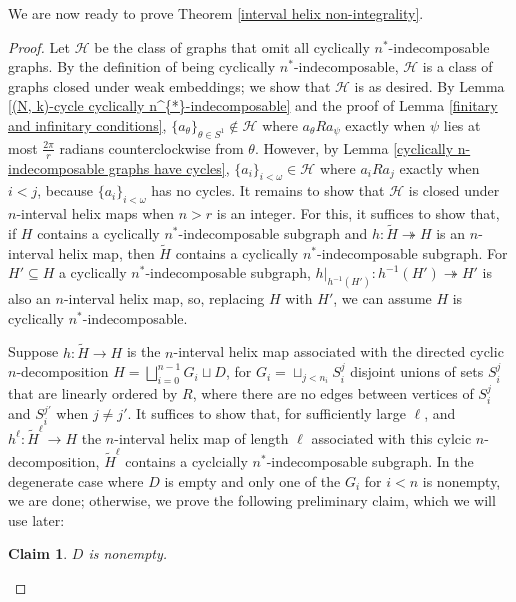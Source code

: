 \documentclass{amsart}
\newtheorem{claim}[theorem]{Claim}
\theoremstyle{definition}
\theoremstyle{remark}
\numberwithin{equation}{section}
\begin{document}
We are now ready to prove Theorem \ref{interval helix non-integrality}.

\begin{proof}
    Let $\mathcal{H}$ be the class of graphs that omit all cyclically $n^{*}$-indecomposable graphs.  By the definition of being cyclically $n^{*}$-indecomposable, $\mathcal{H}$ is a class of graphs closed under weak embeddings; we show that $\mathcal{H}$ is as desired. By Lemma \ref{(N, k)-cycle cyclically n^{*}-indecomposable} and the proof of Lemma \ref{finitary and infinitary conditions}, $\{a_{\theta}\}_{\theta \in S^{1}} \notin \mathcal{H}$ where $a_{\theta} R a_{\psi}$ exactly when $\psi$ lies at most $\frac{2\pi}{r}$ radians counterclockwise from $\theta$. However, by Lemma \ref{cyclically n-indecomposable graphs have cycles}, $\{a_{i}\}_{i < \omega} \in \mathcal{H}$ where $a_{i} R a_{j}$ exactly when $i < j$, because $\{a_{i}\}_{i < \omega}$ has no cycles. It remains to show that $\mathcal{H}$ is closed under $n$-interval helix maps when $n > r$ is an integer. For this, it suffices to show that, if $H$ contains a cyclically $n^{*}$-indecomposable subgraph and $h: \tilde{H} \twoheadrightarrow H$ is an $n$-interval helix map, then $\tilde{H}$ contains a cyclically $n^{*}$-indecomposable subgraph. For $H' \subseteq H$ a cyclically $n^{*}$-indecomposable subgraph, $h|_{h^{-1}(H')}: h^{-1}(H') \twoheadrightarrow H'$ is also an $n$-interval helix map, so, replacing $H$ with $H'$, we can assume $H$ is cyclically $n^{*}$-indecomposable.



Suppose $h: \tilde{H} \to H$ is the $n$-interval helix map associated with the directed cyclic $n$-decomposition $H= \bigsqcup^{n-1}_{i =0} G_{i} \sqcup D$, for $G_{i}=\sqcup_{j < n_{i}} S^{j}_{i}$ disjoint unions of sets $S^{j}_{i}$ that are linearly ordered by $R$, where there are no edges between vertices of $S^{j}_{i}$ and $S^{j'}_{i}$ when $j \neq j'$. It suffices to show that, for sufficiently large $\ell$, and $h^{\ell}: \tilde{H}^{\ell} \to H$ the $n$-interval helix map of length $\ell$ associated with this cylcic $n$-decomposition, $\tilde{H}^{\ell}$ contains a cyclcially $n^{*}$-indecomposable subgraph. In the degenerate case where $D$ is empty and only one of the $G_{i}$ for $i < n$ is nonempty, we are done; otherwise, we prove the following preliminary claim, which we will use later:

\begin{claim}\label{nonempty base}
    $D$ is nonempty.
\end{claim}


\end{proof}
\end{document}
